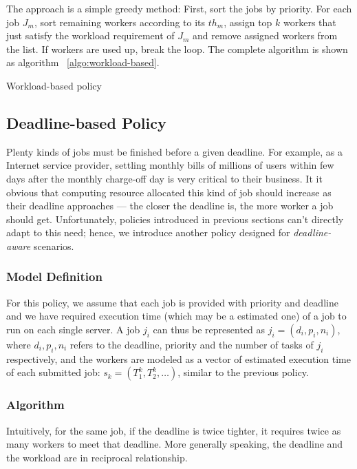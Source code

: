 The approach is a simple greedy method:
First, sort the jobs by priority.
For each job $J_m$, sort remaining workers according to its $th_m$,
assign top $k$ workers that just satisfy the workload requirement of
$J_m$ and remove assigned workers from the list.
If workers are used up, break the loop.
The complete algorithm is shown as algorithm ~\ref{algo:workload-based}.

\begin{algorithm}[]
  
  \caption{Workload-based policy}
  \label{algo:workload-based}
\end{algorithm}

\subsection{Deadline-based Policy}

Plenty kinds of jobs must be finished before a given deadline.
For example, as a Internet service provider, settling monthly bills of
millions of users within few days after the monthly charge-off day is
very critical to their business.
It it obvious that computing resource allocated this kind of job should
increase as their deadline approaches --- the closer the deadline is, the
more worker a job should get.
Unfortunately, policies introduced in previous sections can't directly
adapt to this need; hence, we introduce another policy designed for
\emph{deadline-aware} scenarios.

\subsubsection{Model Definition}

For this policy, we assume that each job is provided with priority and
deadline and we have required execution time (which may be a estimated
one) of a job to run on each single server.
A job $j_i$ can thus be represented as $j_i = (d_i, p_i, n_i)$, where
$d_i, p_i, n_i$ refers to the deadline, priority and the number of tasks
of $j_i$ respectively, and the workers are modeled as a vector of
estimated execution time of each submitted job: $s_k = (T^k_1, T^k_2,
\ldots)$, similar to the previous policy.

\subsubsection{Algorithm}

Intuitively, for the same job, if the deadline is twice tighter, it
requires twice as many workers to meet that deadline.
More generally speaking, the deadline and the workload are in reciprocal
relationship.

